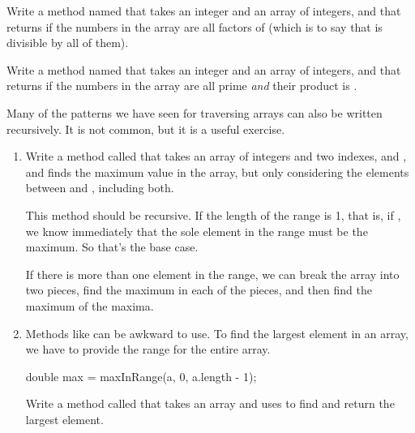 \begin{exercise}  %

Write a method named  that takes an integer  and an array of integers, and that returns  if the numbers in the array are all factors of  (which is to say that  is divisible by all of them).

\end{exercise}


\begin{exercise}  %

Write a method named  that takes an integer  and an array of integers, and that returns  if the numbers in the array are all prime {\it and} their product is .

\end{exercise}


\begin{exercise}  %

Many of the patterns we have seen for traversing arrays can also be written recursively.
It is not common, but it is a useful exercise.

\begin{enumerate}

\item Write a method called  that takes an array of integers and two indexes,  and , and finds the maximum value in the array, but only considering the elements between  and , including both.

This method should be recursive.
If the length of the range is 1, that is, if , we know immediately that the sole element in the range must be the maximum.
So that's the base case.

If there is more than one element in the range, we can break the array into two pieces, find the maximum in each of the pieces, and then find the maximum of the maxima.

\item Methods like  can be awkward to use.
To find the largest element in an array, we have to provide the range for the entire array.

\begin{code}
double max = maxInRange(a, 0, a.length - 1);
\end{code}

Write a method called  that takes an array and uses  to find and return the largest element.

\end{enumerate}

\end{exercise}

